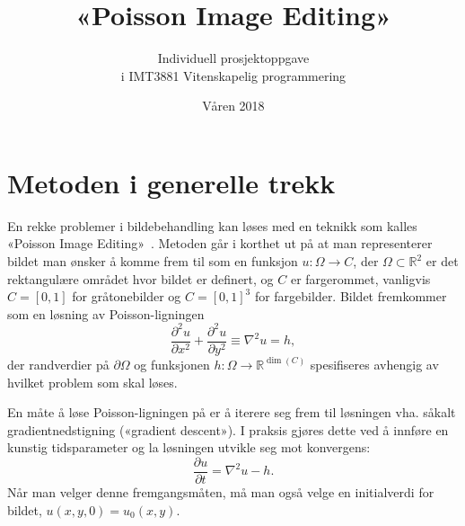 \documentclass[11pt,a4paper]{article}
\begin{document}
\title{«Poisson Image Editing»}
\author{Individuell prosjektoppgave \\
  i IMT3881 Vitenskapelig programmering}
\date{Våren 2018}

\maketitle

\section{Metoden i generelle trekk}

En rekke problemer i bildebehandling kan løses med en teknikk som
kalles «Poisson Image Editing»~\cite{Perez:03}. Metoden går i korthet
ut på at man representerer bildet man ønsker å komme frem til som en
funksjon $u : \Omega \to C$, der $\Omega \subset \mathbb{R}^2$ er det
rektangulære området hvor bildet er definert, og $C$ er fargerommet,
vanligvis $C = [0, 1]$ for gråtonebilder og $C = [0, 1]^3$ for
fargebilder. Bildet fremkommer som en løsning av Poisson-ligningen
$$
\frac{\partial^2 u}{\partial x^2} + \frac{\partial^2 u}{\partial y^2}
\equiv \nabla^2 u = h,
$$
der randverdier på $\partial\Omega$ og funksjonen
$h : \Omega \to \mathbb{R}^{\dim(C)}$ spesifiseres avhengig av hvilket
problem som skal løses.

En måte å løse Poisson-ligningen på er å iterere seg frem til
løsningen vha. såkalt gradientnedstigning («gradient descent»). I
praksis gjøres dette ved å innføre en kunstig tidsparameter og la
løsningen utvikle seg mot konvergens:
\begin{equation}
\frac{\partial u}{\partial t} = \nabla^2 u - h.
\label{eq:diffusjon}
\end{equation}
Når man velger denne fremgangsmåten, må man også velge en initialverdi
for bildet, $u(x, y, 0) = u_0(x, y)$.
\end{document}
